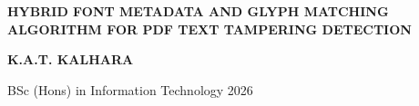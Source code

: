\begin{center}\onehalfspacing
    \MakeUppercase{\textbf{\large HYBRID FONT METADATA AND GLYPH MATCHING Algorithm FOR PDF TEXT TAMPERING DETECTION}}
    
    
    
    \vspace{3in}
    \MakeUppercase{ \textbf{K.A.T. Kalhara}}
    
    \vspace{5.7in}
    
    \large BSc (Hons) in Information Technology \hfill 2026

\end{center} 